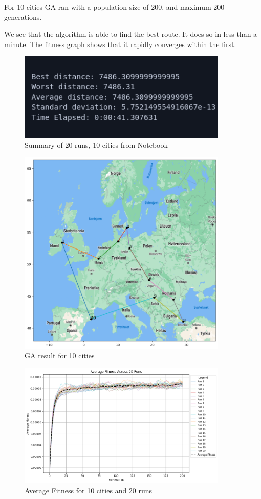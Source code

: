 \documentclass{article}
\begin{document}
    For 10 cities GA ran with a population size of 200, and maximum 200 generations.

    We see that the algorithm is able to find the best route. It does so in less than a minute.
    The fitness graph shows that it rapidly converges within the first.

    \begin{figure}[ht!]
        \includegraphics[width=10cm]{images/ga_10_cities_summary.png}
        \centering
        \caption{Summary of 20 runs, 10 cities from Notebook}
    \end{figure}

    \begin{figure}[ht!]
        \includegraphics[width=10cm]{images/ga_10_cities.png}
        \centering
        \caption{GA result for 10 cities}
    \end{figure}

    \begin{figure}[ht!]
        \includegraphics[width=10cm]{images/ga_10_cities_avg_graph.png}
        \centering
        \caption{Average Fitness for 10 cities and 20 runs}
    \end{figure}
\end{document}
